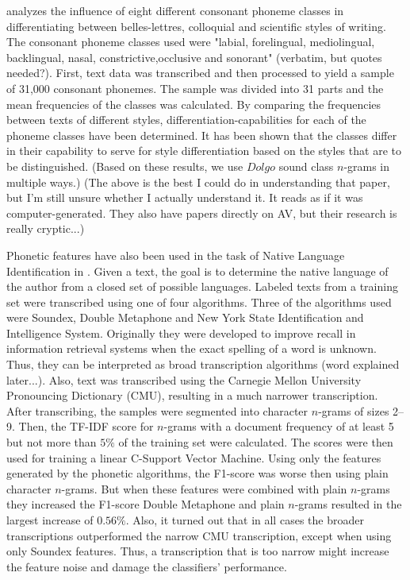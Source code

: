 \cite{khomytska2018authorship} analyzes the influence of eight different consonant phoneme classes in differentiating between belles-lettres, colloquial and scientific styles of writing.
The consonant phoneme classes used were "labial, forelingual, mediolingual, backlingual, nasal, constrictive,occlusive and sonorant" (verbatim, but quotes needed?).
First, text data was transcribed and then processed to yield a sample of 31,000 consonant phonemes.
The sample was divided into 31 parts and the mean frequencies of the classes was calculated.
By comparing the frequencies between texts of different styles, differentiation-capabilities for each of the phoneme classes have been determined.
It has been shown that the classes differ in their capability to serve for style differentiation based on the styles that are to be distinguished.
(Based on these results, we use $Dolgo$ sound class $n$-grams in multiple ways.)
(The above is the best I could do in understanding that paper, but I'm still unsure whether I actually understand it.
It reads as if it was computer-generated.
They also have papers directly on AV, but their research is really cryptic...)

Phonetic features have also been used in the task of Native Language Identification in \cite{smiley2017native}.
Given a text, the goal is to determine the native language of the author from a closed set of possible languages.
Labeled texts from a training set were transcribed using one of four algorithms.
Three of the algorithms used were Soundex, Double Metaphone and New York State Identification and Intelligence System.
Originally they were developed to improve recall in information retrieval systems when the exact spelling of a word is unknown.
Thus, they can be interpreted as broad transcription algorithms (word explained later...).
Also, text was transcribed using the Carnegie Mellon University Pronouncing Dictionary (CMU), resulting in a much narrower transcription.
After transcribing, the samples were segmented into character $n$-grams of sizes 2--9.
Then, the TF-IDF score for $n$-grams with a document frequency of at least 5 but not more than $5\%$ of the training set were calculated.
The scores were then used for training a linear C-Support Vector Machine.
Using only the features generated by the phonetic algorithms, the F1-score was worse then using plain character $n$-grams.
But when these features were combined with plain $n$-grams they increased the F1-score
Double Metaphone and plain $n$-grams resulted in the largest increase of $0.56\%$.
Also, it turned out that in all cases the broader transcriptions outperformed the narrow CMU transcription, except when using only Soundex features.
Thus, a transcription that is too narrow might increase the feature noise and damage the classifiers' performance.


